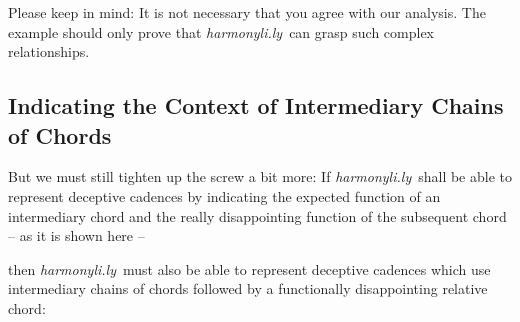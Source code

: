 \documentclass[
  DIV=calc,
  BCOR=5mm,
  12pt,
  headings=small,
  oneside,
  abstract=true,
  toc=bib,
  xcolor=dvipsnames,
  openany,
  ngerman,english]{scrartcl}
\newcommand{\hlyn}[0]{\textit{harmonyli.ly}}
\begin{document}
Please keep in mind: It is not necessary that you agree with our analysis. The
example should only prove that \hlyn\ can grasp such complex relationships.

\subsection{Indicating the Context of Intermediary Chains of Chords}

But we must still tighten up the screw a bit more: If \hlyn\ shall be able to
represent deceptive cadences by indicating the expected function of an
intermediary chord and the really disappointing function of the subsequent chord
-- as it is shown here --

\begin{center}
\end{center}

then \hlyn\  must also be able to represent deceptive cadences which use
intermediary chains of chords followed by a functionally disappointing relative
chord:

\begin{center}
\end{center}
\end{document}
